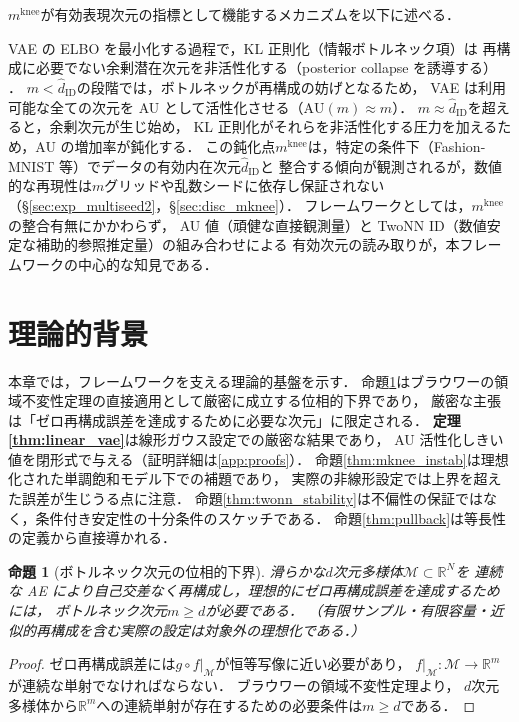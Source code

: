 \documentclass[11pt,a4paper]{jsarticle}
\newtheorem{proposition}{命題}
\newcommand{\R}{\mathbb{R}}
\newcommand{\mknee}{m^{\mathrm{knee}}}
\begin{document}
$\mknee$が有効表現次元の指標として機能するメカニズムを以下に述べる．

VAE の ELBO を最小化する過程で，KL 正則化（情報ボトルネック項）は
再構成に必要でない余剰潜在次元を非活性化する（posterior collapse を誘導する）
\cite{lucas2019elbo,higgins2017betavae}．
$m < \hat{d}_\mathrm{ID}$の段階では，ボトルネックが再構成の妨げとなるため，
VAE は利用可能な全ての次元を AU として活性化させる（$\mathrm{AU}(m) \approx m$）．
$m \approx \hat{d}_\mathrm{ID}$を超えると，余剰次元が生じ始め，
KL 正則化がそれらを非活性化する圧力を加えるため，AU の増加率が鈍化する．
この鈍化点$\mknee$は，特定の条件下（Fashion-MNIST 等）でデータの有効内在次元$\hat{d}_\mathrm{ID}$と
整合する傾向が観測されるが，数値的な再現性は$m$グリッドや乱数シードに依存し保証されない
（§\ref{sec:exp_multiseed2}，§\ref{sec:disc_mknee}）．
フレームワークとしては，$\mknee$の整合有無にかかわらず，
AU 値（頑健な直接観測量）と TwoNN ID（数値安定な補助的参照推定量）の組み合わせによる
有効次元の読み取りが，本フレームワークの中心的な知見である．

\section{理論的背景}\label{sec:theory}

本章では，フレームワークを支える理論的基盤を示す．
命題\ref{thm:lower_bound}はブラウワーの領域不変性定理の直接適用として厳密に成立する位相的下界であり，
厳密な主張は「ゼロ再構成誤差を達成するために必要な次元」に限定される．
\textbf{定理\ref{thm:linear_vae}}は線形ガウス設定での厳密な結果であり，
AU 活性化しきい値を閉形式で与える（証明詳細は\ref{app:proofs}）．
命題\ref{thm:mknee_instab}は理想化された単調飽和モデル下での補題であり，
実際の非線形設定では上界を超えた誤差が生じうる点に注意．
命題\ref{thm:twonn_stability}は不偏性の保証ではなく，条件付き安定性の十分条件のスケッチである．
命題\ref{thm:pullback}は等長性の定義から直接導かれる．

\begin{proposition}[ボトルネック次元の位相的下界]\label{thm:lower_bound}
滑らかな$d$次元多様体$\mathcal{M} \subset \R^N$を
連続な AE により自己交差なく再構成し，理想的にゼロ再構成誤差を達成するためには，
ボトルネック次元$m \geq d$が必要である．
（有限サンプル・有限容量・近似的再構成を含む実際の設定は対象外の理想化である．）
\end{proposition}

\begin{proof}
ゼロ再構成誤差には$g \circ f|_\mathcal{M}$が恒等写像に近い必要があり，
$f|_\mathcal{M}: \mathcal{M} \to \R^m$が連続な単射でなければならない．
ブラウワーの領域不変性定理\cite{hatcher2002algebraic}より，
$d$次元多様体から$\R^m$への連続単射が存在するための必要条件は$m \geq d$である．
\end{proof}
\end{document}
